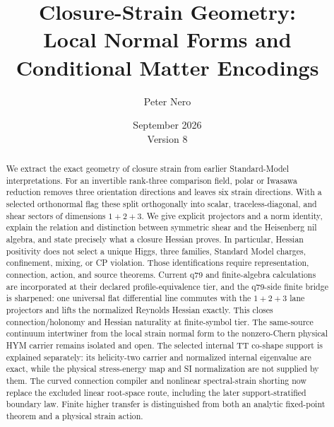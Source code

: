 \documentclass[11pt]{article}
\title{Closure-Strain Geometry:\\
Local Normal Forms and Conditional Matter Encodings}
\author{Peter Nero}
\date{September 2026\\Version 8}
\begin{document}
\maketitle

\begin{abstract}
We extract the exact geometry of closure strain from earlier Standard-Model
interpretations.  For an invertible rank-three comparison field, polar or
Iwasawa reduction removes three orientation directions and leaves six strain
directions.  With a selected orthonormal flag these split orthogonally into
scalar, traceless-diagonal, and shear sectors of dimensions $1+2+3$.  We give
explicit projectors and a norm identity, explain the relation and distinction
between symmetric shear and the Heisenberg nil algebra, and state precisely
what a closure Hessian proves.  In particular, Hessian positivity does not
select a unique Higgs, three families, Standard Model charges, confinement,
mixing, or CP violation.  Those identifications require representation,
connection, action, and source theorems.  Current q79 and finite-algebra
calculations are incorporated at their declared profile-equivalence tier, and
the q79-side finite bridge is sharpened: one universal flat differential line
commutes with the $1+2+3$ lane projectors and lifts the normalized Reynolds
Hessian exactly. This closes connection/holonomy and Hessian naturality at
finite-symbol tier. The same-source continuum intertwiner from the local
strain normal form to the nonzero-Chern physical HYM carrier remains isolated
and open. The selected internal TT co-shape support is explained separately:
its helicity-two carrier and normalized internal eigenvalue are exact, while
the physical stress-energy map and SI normalization are not supplied by them.
The curved connection compiler and nonlinear spectral-strain shorting now
replace the excluded linear root-space route, including the later
support-stratified boundary law. Finite higher transfer is distinguished from
both an analytic fixed-point theorem and a physical strain action.
\end{abstract}
\end{document}
